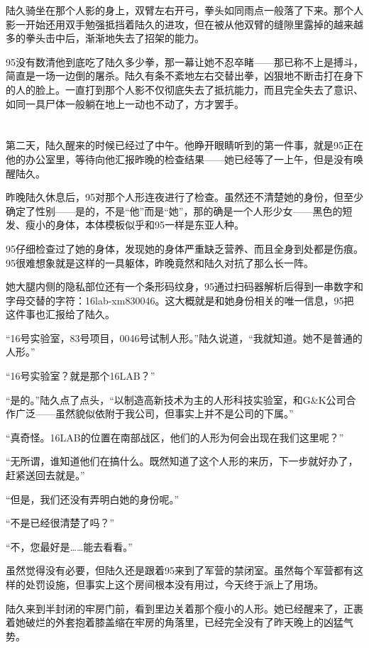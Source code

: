 陆久骑坐在那个人影的身上，双臂左右开弓，拳头如同雨点一般落了下来。那个人影一开始还用双手勉强抵挡着陆久的进攻，但在被从他双臂的缝隙里露掉的越来越多的拳头击中后，渐渐地失去了招架的能力。

95没有数清他到底吃了陆久多少拳，那一幕让她不忍卒睹——那已称不上是搏斗，简直是一场一边倒的屠杀。陆久有条不紊地左右交替出拳，凶狠地不断击打在身下的人的脸上。一直打到那个人影不仅彻底失去了抵抗能力，而且完全失去了意识、如同一具尸体一般躺在地上一动也不动了，方才罢手。

\section*{}

第二天，陆久醒来的时候已经过了中午。他睁开眼睛听到的第一件事，就是95正在他的办公室里，等待向他汇报昨晚的检查结果——她已经等了一上午，但是没有唤醒陆久。

昨晚陆久休息后，95对那个人形连夜进行了检查。虽然还不清楚她的身份，但至少确定了性别——是的，不是“他”而是“她”，那的确是一个人形少女——黑色的短发、瘦小的身体，本体模板似乎和95一样是东亚人种。

95仔细检查过了她的身体，发现她的身体严重缺乏营养、而且全身到处都是伤痕。95很难想象就是这样的一具躯体，昨晚竟然和陆久对抗了那么长一阵。

她大腿内侧的隐私部位还有一个条形码纹身，95通过扫码器解析后得到一串数字和字母交替的字符：16lab-xm830046。这大概就是和她身份相关的唯一信息，95把这件事也汇报给了陆久。

“16号实验室，83号项目，0046号试制人形。”陆久说道，“我就知道。她不是普通的人形。”

“16号实验室？就是那个16LAB？”

“是的。”陆久点了点头，“以制造高新技术为主的人形科技实验室，和G\&K公司合作广泛——虽然貌似依附于我公司，但事实上并不是公司的下属。”

“真奇怪。16LAB的位置在南部战区，他们的人形为何会出现在我们这里呢？”

“无所谓，谁知道他们在搞什么。既然知道了这个人形的来历，下一步就好办了，赶紧送回去就是。”

“但是，我们还没有弄明白她的身份呢。”

“不是已经很清楚了吗？”

“不，您最好是……能去看看。”

虽然觉得没有必要，但陆久还是跟着95来到了军营的禁闭室。虽然每个军营都有这样的处罚设施，但事实上这个房间根本没有用过，今天终于派上了用场。

陆久来到半封闭的牢房门前，看到里边关着那个瘦小的人形。她已经醒来了，正裹着她破烂的外套抱着膝盖缩在牢房的角落里，已经完全没有了昨天晚上的凶猛气势。

